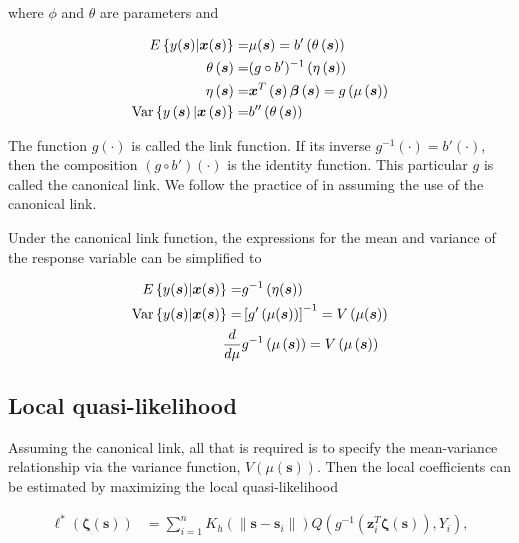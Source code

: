 \documentclass[12pt,english,authoryear, review]{article}\usepackage[]{graphicx}\usepackage[]{color}
\theoremstyle{plain}
\theoremstyle{plain}
\begin{document}
where $\phi$ and $\theta$ are parameters and

\begin{align*}
E\left\{ y(\bm{s})|\bm{x}(\bm{s})\right\} = & \mu(\bm{s})=b'\left(\theta\left(\bm{s}\right)\right)\\
\theta\left(\bm{s}\right)= & (g\circ b')^{-1}\left(\eta\left(\bm{s}\right)\right)\\
\eta\left(\bm{s}\right)= & \bm{x}^{T}\left(\bm{s}\right)\bm{\beta}\left(\bm{s}\right)=g\left(\mu\left(\bm{s}\right)\right)\\
\text{\text{Var}}\left\{ y\left(\bm{s}\right)|\bm{x}\left(\bm{s}\right)\right\} = & b''\left(\theta\left(\bm{s}\right)\right)
\end{align*}


The function $g(\cdot)$ is called the link function. If its inverse
$g^{-1}(\cdot)=b'(\cdot)$, then the composition $\left(g\circ b'\right)\left(\cdot\right)$
is the identity function. This particular $g$ is called the canonical
link. We follow the practice of \citet{Fan-Heckman-Wand-1995} in
assuming the use of the canonical link.

Under the canonical link function, the expressions for the mean and
variance of the response variable can be simplified to

\begin{align*}
E\left\{ y(\bm{s})|\bm{x}(\bm{s})\right\} = & g^{-1}\left(\eta(\bm{s})\right)\\
\text{\text{Var}}\left\{ y(\bm{s})|\bm{x}(\bm{s})\right\} = & \left[g'\left(\mu(\bm{s})\right)\right]^{-1}=V\left(\mu(\bm{s})\right)\\
\frac{d}{d\mu} & g^{-1}\left(\mu\left(\bm{s}\right)\right)=V\left(\mu\left(\bm{s}\right)\right)
\end{align*}
 


\subsection{Local quasi-likelihood}

Assuming the canonical link, all that is required is to specify the
mean-variance relationship via the variance function, $V\left(\mu\left(\bm{s}\right)\right)$.
Then the local coefficients can be estimated by maximizing the local
quasi-likelihood 

\begin{align}
\mathcal{\ell}^{*}\left(\bm{\zeta}(\bm{s})\right) & =\sum_{i=1}^{n}K_{h}\left(\|\bm{s}-\bm{s}_{i}\|\right)Q\left(g^{-1}\left(\bm{z}_{i}^{T}\bm{\zeta}(\bm{s})\right),Y_{i}\right),
\end{align}
\end{document}
